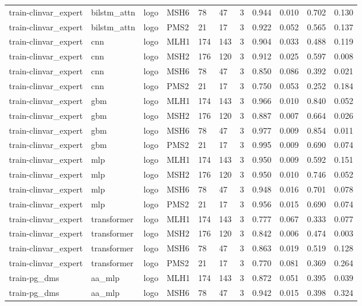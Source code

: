 \begin{table}[t]
\begin{tabular}{lllllllllll}
train-clinvar\_expert & bilstm\_attn & logo & MSH6 & 78 & 47 & 3 & 0.944 & 0.010 & 0.702 & 0.130 \\
train-clinvar\_expert & bilstm\_attn & logo & PMS2 & 21 & 17 & 3 & 0.922 & 0.052 & 0.565 & 0.137 \\
train-clinvar\_expert & cnn & logo & MLH1 & 174 & 143 & 3 & 0.904 & 0.033 & 0.488 & 0.119 \\
train-clinvar\_expert & cnn & logo & MSH2 & 176 & 120 & 3 & 0.912 & 0.025 & 0.597 & 0.008 \\
train-clinvar\_expert & cnn & logo & MSH6 & 78 & 47 & 3 & 0.850 & 0.086 & 0.392 & 0.021 \\
train-clinvar\_expert & cnn & logo & PMS2 & 21 & 17 & 3 & 0.750 & 0.053 & 0.252 & 0.184 \\
train-clinvar\_expert & gbm & logo & MLH1 & 174 & 143 & 3 & 0.966 & 0.010 & 0.840 & 0.052 \\
train-clinvar\_expert & gbm & logo & MSH2 & 176 & 120 & 3 & 0.887 & 0.007 & 0.664 & 0.026 \\
train-clinvar\_expert & gbm & logo & MSH6 & 78 & 47 & 3 & 0.977 & 0.009 & 0.854 & 0.011 \\
train-clinvar\_expert & gbm & logo & PMS2 & 21 & 17 & 3 & 0.995 & 0.009 & 0.690 & 0.074 \\
train-clinvar\_expert & mlp & logo & MLH1 & 174 & 143 & 3 & 0.950 & 0.009 & 0.592 & 0.151 \\
train-clinvar\_expert & mlp & logo & MSH2 & 176 & 120 & 3 & 0.950 & 0.010 & 0.746 & 0.052 \\
train-clinvar\_expert & mlp & logo & MSH6 & 78 & 47 & 3 & 0.948 & 0.016 & 0.701 & 0.078 \\
train-clinvar\_expert & mlp & logo & PMS2 & 21 & 17 & 3 & 0.956 & 0.015 & 0.690 & 0.074 \\
train-clinvar\_expert & transformer & logo & MLH1 & 174 & 143 & 3 & 0.777 & 0.067 & 0.333 & 0.077 \\
train-clinvar\_expert & transformer & logo & MSH2 & 176 & 120 & 3 & 0.842 & 0.006 & 0.474 & 0.003 \\
train-clinvar\_expert & transformer & logo & MSH6 & 78 & 47 & 3 & 0.863 & 0.019 & 0.519 & 0.128 \\
train-clinvar\_expert & transformer & logo & PMS2 & 21 & 17 & 3 & 0.770 & 0.081 & 0.369 & 0.264 \\
train-pg\_dms & aa\_mlp & logo & MLH1 & 174 & 143 & 3 & 0.872 & 0.051 & 0.395 & 0.039 \\
train-pg\_dms & aa\_mlp & logo & MSH6 & 78 & 47 & 3 & 0.942 & 0.015 & 0.398 & 0.324 \\

\end{tabular}
\end{table}
